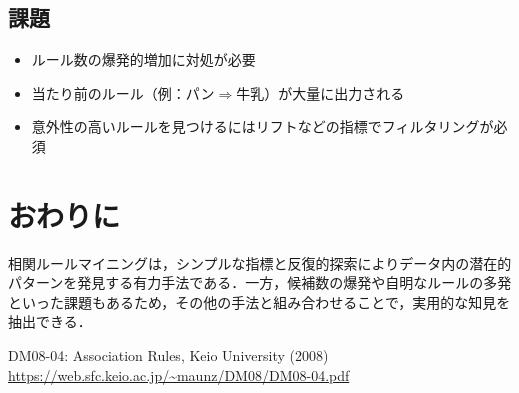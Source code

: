 \documentclass[a4j]{jsarticle}
\begin{document}
\subsection{課題}
\begin{itemize}
  \item ルール数の爆発的増加に対処が必要
  \item 当たり前のルール（例：パン$\Rightarrow$牛乳）が大量に出力される
  \item 意外性の高いルールを見つけるにはリフトなどの指標でフィルタリングが必須
\end{itemize}

\section{おわりに}

相関ルールマイニングは，シンプルな指標と反復的探索によりデータ内の潜在的パターンを発見する有力手法である．一方，候補数の爆発や自明なルールの多発といった課題もあるため，その他の手法と組み合わせることで，実用的な知見を抽出できる．

\begin{thebibliography}{99}
   DM08-04: Association Rules, Keio University (2008)\\
        \url{https://web.sfc.keio.ac.jp/~maunz/DM08/DM08-04.pdf}
\end{thebibliography}
\end{document}
